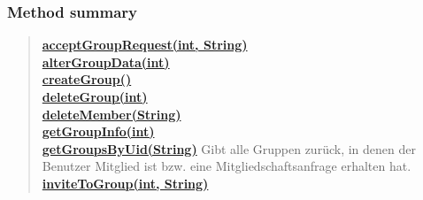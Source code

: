 \documentclass[11pt,a4paper]{report}
\begin{document}
{{{{\subsubsection{Method summary}{
\begin{verse}
\hyperlink{edu.kit.pse17.go_app.ServerCommunication.TomcatRestApi.acceptGroupRequest(int, java.lang.String)}{{\bf acceptGroupRequest(int, String)}} \\
\hyperlink{edu.kit.pse17.go_app.ServerCommunication.TomcatRestApi.alterGroupData(int)}{{\bf alterGroupData(int)}} \\
\hyperlink{edu.kit.pse17.go_app.ServerCommunication.TomcatRestApi.createGroup()}{{\bf createGroup()}} \\
\hyperlink{edu.kit.pse17.go_app.ServerCommunication.TomcatRestApi.deleteGroup(int)}{{\bf deleteGroup(int)}} \\
\hyperlink{edu.kit.pse17.go_app.ServerCommunication.TomcatRestApi.deleteMember(java.lang.String)}{{\bf deleteMember(String)}} \\
\hyperlink{edu.kit.pse17.go_app.ServerCommunication.TomcatRestApi.getGroupInfo(int)}{{\bf getGroupInfo(int)}} \\
\hyperlink{edu.kit.pse17.go_app.ServerCommunication.TomcatRestApi.getGroupsByUid(java.lang.String)}{{\bf getGroupsByUid(String)}} Gibt alle Gruppen zurück, in denen der Benutzer Mitglied ist bzw. eine Mitgliedschaftsanfrage erhalten hat.\\
\hyperlink{edu.kit.pse17.go_app.ServerCommunication.TomcatRestApi.inviteToGroup(int, java.lang.String)}{{\bf inviteToGroup(int, String)}} \\
\end{verse}
}
}}}}
\end{document}
